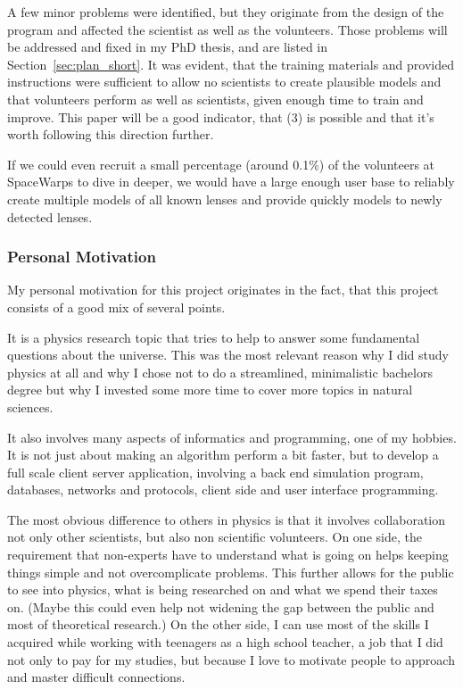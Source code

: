 \documentclass[11pt]{article}
\begin{document}
A few minor problems were identified, but they originate from the design of the program and affected the scientist as well as the volunteers.
Those problems will be addressed and fixed in my PhD thesis, and are listed in Section~\ref{sec:plan_short}.
It was evident, that the training materials and provided instructions were sufficient to allow no scientists to create plausible models and that volunteers perform as well as scientists, given enough time to train and improve.
This paper will be a good indicator, that (3) is possible and that it's worth following this direction further.


If we could even recruit a small percentage (around 0.1\%) of the volunteers at SpaceWarps to dive in deeper, we would have a large enough user base to reliably create multiple models of all known lenses and provide quickly models to newly detected lenses.



\subsubsection{Personal Motivation}

My personal motivation for this project originates in the fact, that this project consists of a good mix of several points.

It is a physics research topic that tries to help to answer some fundamental questions about the universe.
This was the most relevant reason why I did study physics at all and why I chose not to do a streamlined, minimalistic bachelors degree but why I invested some more time to cover more topics in natural sciences.

It also involves many aspects of informatics and programming, one of my hobbies.
It is not just about making an algorithm perform a bit faster, but to develop a full scale client server application, involving a back end simulation program, databases, networks and protocols, client side and user interface programming.

The most obvious difference to others in physics is that it involves collaboration not only other scientists, but also non scientific volunteers.
On one side, the requirement that non-experts have to understand what is going on helps keeping things simple and not overcomplicate problems.
This further allows for the public to see into physics, what is being researched on and what we spend their taxes on.
(Maybe this could even help not widening the gap between the public and most of theoretical research.)
On the other side, I can use most of the skills I acquired while working with teenagers as a high school teacher, a job that I did not only to pay for my studies, but because I love to motivate people to approach and master difficult connections.
\end{document}
